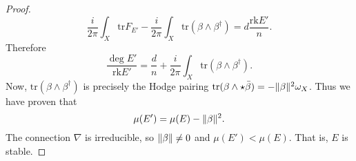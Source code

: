 \documentclass[12pt,a4paper]{book}
\theoremstyle{definition} \newtheorem{defn}[thm]{Definition}
\theoremstyle{definition} \newtheorem{ejemplo}[thm]{Example}
\theoremstyle{remark} \newtheorem*{rem}{Remark}
\def\tr{\mathrm{tr}}
\def\rk{\mathrm{rk}}
\DeclarePairedDelimiter\norm{\lVert}{\rVert}
\begin{document}
\begin{proof}
\begin{equation*}
  \frac{i}{2\pi}\int_X \tr F_{E'} - \frac{i}{2\pi} \int_X \tr(\beta \wedge \beta^\dagger) = d\frac{\rk E'}{n}.
\end{equation*}
Therefore
\begin{equation*}
  \frac{\deg E'}{ \rk E'} = \frac{d}{n} + \frac{i}{2\pi} \int_X \tr(\beta \wedge \beta^\dagger).
\end{equation*}
Now, $\tr(\beta\wedge \beta^\dagger)$ is precisely the Hodge pairing $\tr(\beta \wedge \star \bar{\beta}) = - \norm{\beta}^2 \omega_X$. Thus we have proven that 
\begin{equation*}
\mu(E')= \mu(E) - \norm{\beta}^2 .
\end{equation*}
The connection $\nabla$ is irreducible, so $\norm{\beta}\neq 0$ and $\mu(E')< \mu(E)$. That is, $E$ is stable.
\end{proof}

\nocite{*}


\end{document}
